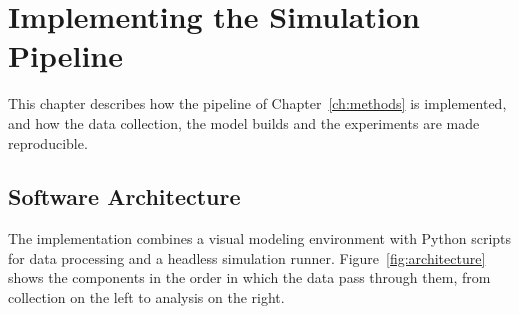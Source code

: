 \chapter{Implementing the Simulation Pipeline}
\label{ch:implementation}

This chapter describes how the pipeline of Chapter~\ref{ch:methods} is implemented, and how the data collection, the model builds and the experiments are made reproducible.

\section{Software Architecture}

The implementation combines a visual modeling environment with Python scripts for data processing and a headless simulation runner. Figure~\ref{fig:architecture} shows the components in the order in which the data pass through them, from collection on the left to analysis on the right.

